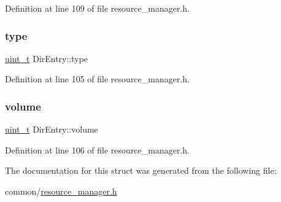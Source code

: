 Definition at line 109 of file resource\+\_\+manager.\+h.

\mbox{\label{structDirEntry_adeb5570e6f7540b047206013d57d4871}} 
\subsubsection{\texorpdfstring{type}{type}}
{\footnotesize\ttfamily \hyperlink{compiler__port_8h_a12a1e9b3ce141648783a82445d02b58d}{uint\+\_\+t} Dir\+Entry\+::type}



Definition at line 105 of file resource\+\_\+manager.\+h.

\mbox{\label{structDirEntry_a3868566fb2e5c61cdbff7c0a07836d27}} 
\subsubsection{\texorpdfstring{volume}{volume}}
{\footnotesize\ttfamily \hyperlink{compiler__port_8h_a12a1e9b3ce141648783a82445d02b58d}{uint\+\_\+t} Dir\+Entry\+::volume}



Definition at line 106 of file resource\+\_\+manager.\+h.



The documentation for this struct was generated from the following file\+:\begin{DoxyCompactItemize}
\item 
common/\hyperlink{resource__manager_8h}{resource\+\_\+manager.\+h}\end{DoxyCompactItemize}
